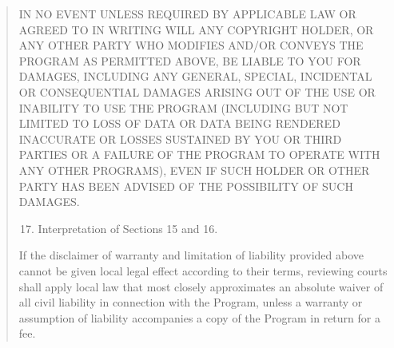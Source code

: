 \documentclass[letterpaper,10pt,english]{sphinxmanual}
\begin{document}
\begin{quote}
\begin{enumerate}
\end{enumerate}

IN NO EVENT UNLESS REQUIRED BY APPLICABLE LAW OR AGREED TO IN WRITING
WILL ANY COPYRIGHT HOLDER, OR ANY OTHER PARTY WHO MODIFIES AND/OR CONVEYS
THE PROGRAM AS PERMITTED ABOVE, BE LIABLE TO YOU FOR DAMAGES, INCLUDING ANY
GENERAL, SPECIAL, INCIDENTAL OR CONSEQUENTIAL DAMAGES ARISING OUT OF THE
USE OR INABILITY TO USE THE PROGRAM (INCLUDING BUT NOT LIMITED TO LOSS OF
DATA OR DATA BEING RENDERED INACCURATE OR LOSSES SUSTAINED BY YOU OR THIRD
PARTIES OR A FAILURE OF THE PROGRAM TO OPERATE WITH ANY OTHER PROGRAMS),
EVEN IF SUCH HOLDER OR OTHER PARTY HAS BEEN ADVISED OF THE POSSIBILITY OF
SUCH DAMAGES.
\begin{enumerate}
\setcounter{enumi}{16}
\item {} 
Interpretation of Sections 15 and 16.

\end{enumerate}

If the disclaimer of warranty and limitation of liability provided
above cannot be given local legal effect according to their terms,
reviewing courts shall apply local law that most closely approximates
an absolute waiver of all civil liability in connection with the
Program, unless a warranty or assumption of liability accompanies a
copy of the Program in return for a fee.
\end{quote}
\end{document}
